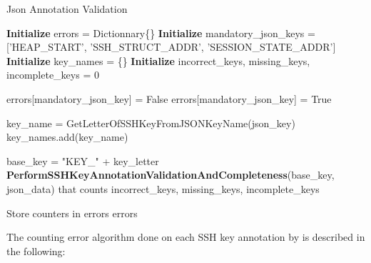     \begin{algorithm}[H]
        \caption{Json Annotation Validation}
        \begin{algorithmic}[1]
            \State \textbf{Initialize} errors = Dictionnary\{\} 
            \State \textbf{Initialize} mandatory\_json\_keys = ['HEAP\_START', 'SSH\_STRUCT\_ADDR', 'SESSION\_STATE\_ADDR']
            \State \textbf{Initialize} key\_names = \{\}
            \State \textbf{Initialize} incorrect\_keys, missing\_keys, incomplete\_keys = 0
            
             
                    \State errors[mandatory\_json\_key] = False
                \Else
                    \State errors[mandatory\_json\_key] = True
                \EndIf
            \EndFor
            
             
                    \State key\_name = GetLetterOfSSHKeyFromJSONKeyName(json\_key)
                    \State key\_names.add(key\_name)
                \EndIf
            \EndFor
            
                \State base\_key = "KEY\_" + key\_letter
                \State \textbf{PerformSSHKeyAnnotationValidationAndCompleteness}(base\_key, json\_data) that counts incorrect\_keys, missing\_keys, incomplete\_keys
            \EndFor
            
            \State Store counters in errors
            \State \Return errors
        \EndProcedure
        \end{algorithmic}
    \end{algorithm}

    The counting error algorithm done on each SSH key annotation by is described in the following:

